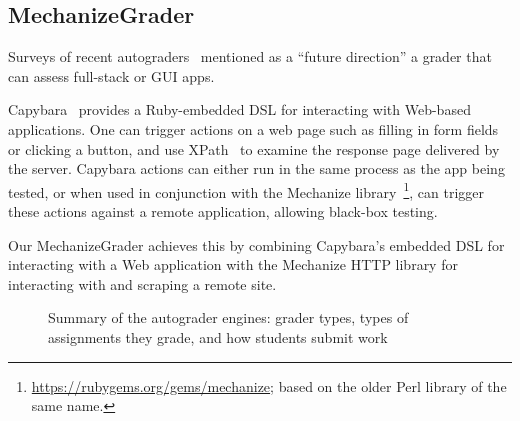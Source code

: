 \subsection{MechanizeGrader}

Surveys of recent
autograders~\cite{ihantola-2010-autograding-survey,douce-2005-autograding-survey} mentioned as
a ``future direction'' a grader that can assess full-stack or GUI apps.


Capybara~
provides a Ruby-embedded DSL for interacting with Web-based
applications.
One can trigger actions on a web page such as filling in form fields
or clicking a button, and use XPath~\cite{xpath} to examine the
response page delivered by the server.
Capybara actions can either run in the same process as the app being
tested, or when used in conjunction with the Mechanize
library~\footnote{\url{https://rubygems.org/gems/mechanize}; based on
  the older Perl library of the same name.}, can trigger these actions
against a remote application, allowing black-box testing.



Our MechanizeGrader achieves this by combining Capybara's embedded DSL
for interacting with a Web application with the Mechanize HTTP library
for interacting with and scraping a remote site.




\begin{figure}
  
  \caption{\label{fig:grader_summary} Summary of the autograder
    engines: grader types, types of assignments they grade, and
    how students submit work}
\end{figure}


